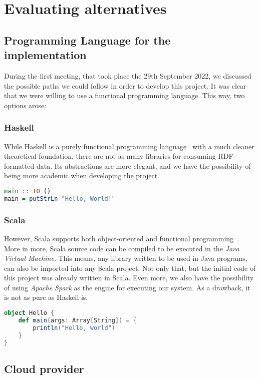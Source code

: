 \section{Evaluating alternatives}

\subsection{Programming Language for the implementation}

During the first meeting, that took place the 29th September 2022, we discussed the possible paths we could follow in order to develop this project. It was clear that we were willing to use a functional programming language. This way, two options arose:

\subsubsection{Haskell}

While Haskell is a purely functional programming language~\cite{wiki:Haskell} with a much cleaner theoretical foundation, there are not as many libraries for consuming RDF-formatted data. Its abstractions are more elegant, and we have the possibility of being more academic when developing the project.

\begin{lstlisting}[language=Haskell, caption=\textit{Hello World!} program written in Haskell]
main :: IO ()
main = putStrLn "Hello, World!"
\end{lstlisting}

\subsubsection{Scala}

However, Scala supports both object-oriented and functional programming~\cite{wiki:Scala_programming_language}. More in more, Scala source code can be compiled to be executed in the \textit{Java Virtual Machine}. This means, any library written to be used in Java programs, can also be imported into any Scala project. Not only that, but the initial code of this project was already written in Scala. Even more, we also have the possibility of using \textit{Apache Spark} as the engine for executing our system. As a drawback, it is not as pure as Haskell is.

\begin{lstlisting}[language=Scala, caption=\textit{Hello World!} program written in Scala 2]
object Hello {
    def main(args: Array[String]) = {
        println("Hello, world")
    }
}
\end{lstlisting}

\subsection{Cloud provider}